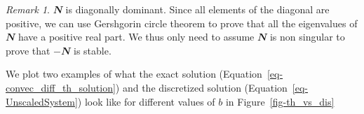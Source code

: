 \documentclass[
  letterpaper,
]{report}
\theoremstyle{definition}
\theoremstyle{plain}
\theoremstyle{definition}
\theoremstyle{remark}
\newtheorem*{remark}{Remark}
\begin{document}
\begin{remark}
\(\mathbfit{N}\) is diagonally dominant. Since all elements of the
diagonal are positive, we can use Gershgorin circle theorem to prove
that all the eigenvalues of \(\mathbfit{N}\) have a positive real part.
We thus only need to assume \(\mathbfit{N}\) is non singular to prove
that \(-\mathbfit{N}\) is stable.
\end{remark}

We plot two examples of what the exact solution
(Equation~\ref{eq-convec_diff_th_solution}) and the discretized solution
(Equation~\ref{eq-UnscaledSystem}) look like for different values of
\(b\) in Figure~\ref{fig-th_vs_dis}

\begin{figure}

\begin{minipage}{0.50\linewidth}



\end{minipage}%
%
\begin{minipage}{0.50\linewidth}

\end{minipage}
\end{figure}
\end{document}
